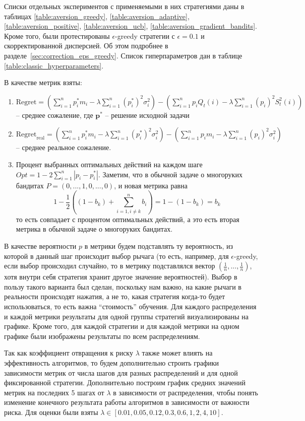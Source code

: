 Списки отдельных экспериментов с применяемыми в них стратегиями даны в таблицах \ref{table:aversion_greedy}, \ref{table:aversion_adaptive}, \ref{table:aversion_positive}, \ref{table:aversion_ucb}, \ref{table:aversion_gradient_bandits}. Кроме того, были протестированы $\epsilon$-greedy стратегии с $\epsilon=0.1$ и скорректированной дисперсией. Об этом подробнее в разделе~\ref{sec:correction_eps_greedy}. Список гиперпараметров дан в таблице \ref{table:classic_hyperparameters}.

В качестве метрик взяты:
\begin{enumerate}
    \item $\text{Regret} = \left( \sum_{i=1}^n p_i^* m_i - \lambda \sum_{i=1}^n (p_i^*)^2 \sigma_i^2 \right) - \left( \sum_{i=1}^n p_i Q_t(i) - \lambda \sum_{i=1}^n (p_i)^2 S_t^2(i) \right)$ -- среднее сожаление, где $\textbf{p}^*$ -- решение исходной задачи
    \item $\text{Regret}_{{\text{real}}} = \left( \sum_{i=1}^n p_i^* m_i - \lambda \sum_{i=1}^n (p_i^*)^2 \sigma_i^2 \right) - \left( \sum_{i=1}^n p_i m_i - \lambda \sum_{i=1}^n (p_i)^2 \sigma_i^2 \right)$ -- среднее реальное сожаление.
    \item Процент выбранных оптимальных действий на каждом шаге $Opt = 1 - 2 \sum_{i=1}^n |p_i - p_i^*|$. Заметим, что в обычной задаче о многоруких бандитах $P = (0, ..., 1, 0, ..., 0)$, и новая метрика равна 
    \[
    1 - \frac{1}{2}\left( (1 - b_k) + \sum_{i = 1, i \neq k}^n b_i \right) = 1 - (1 - b_k) = b_k
    \]
    то есть совпадает с процентом оптимальных действий, а это есть вторая метрика в обычной задаче о многоруких бандитах.
\end{enumerate}
В качестве вероятности $p$ в метрики будем подставлять ту вероятность, из которой в данный шаг происходит выбор рычага (то есть, например, для $\epsilon$-greedy, если выбор происходил случайно, то в метрику подставлялся вектор $\left( \frac{1}{n}, ..., \frac{1}{n} \right)$, хотя внутри себя стратегия хранит другое значение вероятностей). Выбор в пользу такого варианта был сделан, поскольку нам важно, на какие рычаги в реальности происходят нажатия, а не то, какая стратегия когда-то будет использоваться, то есть важна ``стоимость'' обучения. Для каждого распределения и каждой метрики результаты для одной группы стратегий визуализированы на графике. Кроме того, для каждой стратегии и для каждой метрики на одном графике были изображены результаты по всем распределениям.
 
Так как коэффициент отвращения к риску $\lambda$ также может влиять на эффективность алгоритмов, то будем дополнительно строить графики зависимости метрик от числа шагов для разных распределений и для одной фиксированной стратегии. Дополнительно построим график средних значений метрик на последних 5 шагах от $\lambda$ в зависимости от распределения, чтобы понять изменение конечного результата работы алгоритмов в зависимости от важности риска. Для оценки были взяты $\lambda \in [0.01, 0.05, 0.12, 0.3, 0.6, 1, 2, 4, 10]$.

